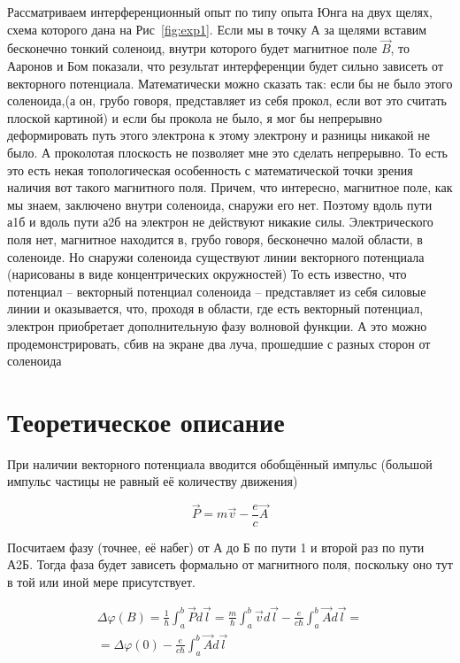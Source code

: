 \documentclass[a4paper, 14pt]{article}
\begin{document}
    Рассматриваем интерференционный опыт по типу опыта Юнга на двух щелях, схема которого дана на Рис~\ref{fig:exp1}.
    Если мы в точку А за щелями вставим бесконечно тонкий соленоид, внутри которого будет магнитное поле $\vec{B}$,
    то Ааронов и Бом показали, что результат интерференции будет сильно зависеть от векторного потенциала.
    Математически можно сказать так: если бы не было этого соленоида,(а он, грубо говоря, представляет из себя
    прокол, если вот это считать плоской картиной) и если бы прокола не было, я мог бы непрерывно деформировать путь
    этого электрона к этому электрону и разницы никакой не было.
    А проколотая плоскость не позволяет мне это сделать непрерывно.
    То есть это есть некая топологическая особенность с математической точки зрения наличия вот такого магнитного поля.
    Причем, что интересно, магнитное поле, как мы знаем, заключено внутри соленоида, снаружи его нет.
    Поэтому вдоль пути а1б и вдоль пути а2б на электрон не действуют никакие силы.
    Электрического поля нет, магнитное находится в, грубо говоря, бесконечно малой области, в соленоиде.
    Но снаружи соленоида существуют линии векторного потенциала (нарисованы в виде концентрических окружностей)
    То есть известно, что потенциал -- векторный потенциал соленоида -- представляет из себя силовые линии и
    оказывается, что, проходя в области, где есть векторный потенциал, электрон приобретает дополнительную фазу
    волновой функции.
    А это можно продемонстрировать, сбив на экране два луча, прошедшие с разных сторон от соленоида
    
    \section*{Теоретическое описание} 
    
    При наличии векторного потенциала вводится обобщённый импульс (большой импульс частицы не равный её количеству
    движения)
    
    \[ \vec{P} = m \vec{v} - \frac{e}{c} \vec{A} \]
    
    Посчитаем фазу (точнее, её набег) от А до Б по пути 1 и второй раз по пути А2Б.
    Тогда фаза будет зависеть формально от магнитного поля, поскольку оно тут в той или иной мере присутствует.
    
    \begin{gather}
        \Delta \varphi(B) = \frac{1}{\hbar} \int_a^b \vec{P} d \vec{l} = \frac{m}{\hbar} \int_a^b \vec{v} d \vec{l} -
        \frac{e}{c \hbar} \int_a^b \vec{A} d \vec{l} = \\
        = \Delta \varphi(0) - \frac{e}{c \hbar} \int_a^b \vec{A} d \vec{l}
    \end{gather}
    
\end{document}
